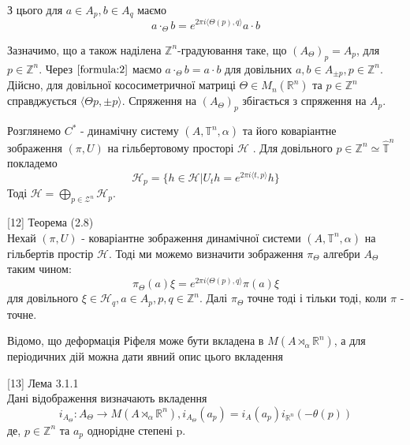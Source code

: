 З цього для $a \in A_p, b \in A_q$ маємо
\begin{equation}
    \label{formula:2}
    a \cdot_\Theta b = e^{2 \pi i \langle \Theta(p), q \rangle} a \cdot b
\end{equation}

\begin{remark}
    Зазначимо, що а також наділена $\mathbb{Z}^n$-градуювання таке, що
    $(A_\Theta)_p = A_p$, для $p \in \mathbb{Z}^n$.
    Через $\ref{formula:2}$ маємо $a \cdot_\Theta b = a \cdot b$ для
    довільних $a,b \in A_{\pm p}, p \in \mathbb{Z}^n$.
    Дійсно, для довільної кососиметричної матриці $\Theta \in M_n(\mathbb{R}^n)$
    та $p \in \mathbb{Z}^n$ справджується $\langle \Theta p, \pm p \rangle.$
    Спряження на $(A_\Theta)_p$ збігається з спряження на $A_p$.
\end{remark}

Розглянемо $C^*$ - динамічну систему $(A, \mathbb{T}^n, \alpha)$ та його
коваріантне \\ зображення $(\pi, U)$ на гільбертовому просторі $\mathcal{H}$ .
Для довільного $p \in \mathbb{Z}^n \simeq \hat{\mathbb{T}}^n$ покладемо
\begin{equation*}
    \mathcal{H}_p = \{ h \in \mathcal{H} | U_t h = e^{2 \pi i \langle t, p \rangle} h \}
\end{equation*}
Тоді $\mathcal{H} = \bigoplus_{p \in \mathcal{Z}^n} \mathcal{H}_p$.

\begin{proposition}{[12] Теорема (2.8)} \\

    Нехай $(\pi, U)$ - коваріантне зображення динамічної системи $(A, \mathbb{T}^n, \alpha)$ на гільбертів простір $\mathcal{H}$.
    Тоді ми можемо визначити зображення $\pi_\Theta$ алгебри $A_\Theta$ таким чином:
    \begin{equation*}
        \pi_\Theta(a) \xi = e^{2 \pi i \langle \Theta(p), q \rangle} \pi(a) \xi
    \end{equation*}
    для довільного $\xi \in \mathcal{H}_q, a \in A_p, p,q \in \mathbb{Z}^n$.
    Далі $\pi_\Theta$ точне тоді і тільки тоді, коли $\pi$ - точне.
\end{proposition}

Відомо, що деформація Ріфеля може бути вкладена в $M(A \rtimes_\alpha \mathbb{R}^n)$,
а для періодичних дій можна дати явний опис цього вкладення
\begin{proposition}{[13] Лема 3.1.1} \\

    Дані відображення визначають вкладення
    \begin{equation*}
        i_{A_\Theta}: A_\Theta \to M(A \rtimes_\alpha \mathbb{R}^n), i_{A_\Theta}(a_p) = i_A(a_p)i_{\mathbb{R}^n}(- \theta(p))
    \end{equation*}
    де, $p \in \mathbb{Z}^n$ та $a_p$ однорідне степені p.
\end{proposition}

